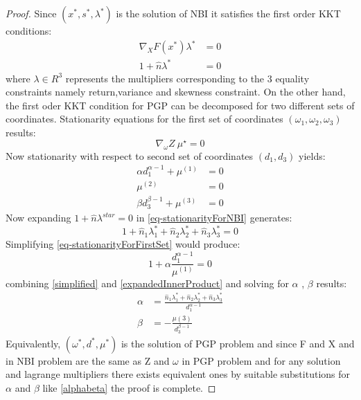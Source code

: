 \documentclass[12pt,a4paper]{article}
\numberwithin{equation}{section}
\begin{document}
\begin{proof}
Since $(x^{*},s^{*},\lambda^{*})$ is the solution of NBI it satisfies the first order KKT conditions:
\begin{equation} \label{eq-stationarityForNBI}
\begin{split}
\nabla_{X}F(x^{*})\lambda^{*}&=0  \\
1+\hat{n}\lambda^{*}&=0
\end{split}
\end{equation}
where $\lambda\in R^{3}$ represents the multipliers corresponding to the 3 equality constraints namely return,variance and skewness constraint.
On the other hand, the first oder KKT condition for PGP can be decomposed for two different sets of coordinates. Stationarity equations for the first set of coordinates $(\omega_{1},\omega_{2},\omega_{3})$ results:
\begin{equation}  \label{eq-stationarityForFirstSet} 
\nabla_{\omega}Z \ \mu^{\star}=0
\end{equation} 
Now stationarity with respect to second set of coordinates $(d_{1},d_{3})$ yields:
\begin{equation}  \label{eq-stationarityForSecondSet} 
\begin{split}
\alpha d_{1}^{\alpha -1}+\mu^{(1)}&=0  \\
\mu^{(2)}&=0  \\
\beta d_{3}^{\beta -1}+\mu^{(3)}&=0  
\end{split}
\end{equation}
Now expanding $1+\hat{n}\lambda^{star}=0$ in \ref{eq-stationarityForNBI} generates:
\begin{equation}  \label{expandedInnerProduct}
1+\hat{n}_{1}\lambda_{1}^{*}+\hat{n}_{2}\lambda_{2}^{*}+\hat{n}_{3}\lambda_{3}^{*}=0
\end{equation}
Simplifying \ref{eq-stationarityForFirstSet} would produce:
\begin{equation}   \label{simplified}
1+\alpha \frac{d_{1}^{\alpha -1}}{\mu^{(1)}}=0   
\end{equation}
combining \eqref{simplified} and \eqref{expandedInnerProduct} and solving for 
$\alpha$ , $\beta$ results:
\begin{equation}  \label{alphabeta}
\begin{split}
\alpha&=\frac{\hat{n}_{1}\lambda_{1}^{*}+\hat{n}_{2}\lambda_{2}^{*}+\hat{n}_{3}  \lambda_{3}^{*}}{d_{1}^{\alpha-1}}   \\
\beta&=-\frac{\mu{(3)}}{d_{3}^{\beta-1}}
\end{split}
\end{equation}
Equivalently, $(\omega^{*},d^{*},\mu^{*})$ is the solution of PGP problem and since F and X and in NBI problem are the same as Z and $\omega$ in PGP problem and for any solution and lagrange multipliers there exists equivalent ones by suitable substitutions for $\alpha$ and $\beta$ like \eqref{alphabeta} the proof is complete.   
\end{proof} 
\end{document}

